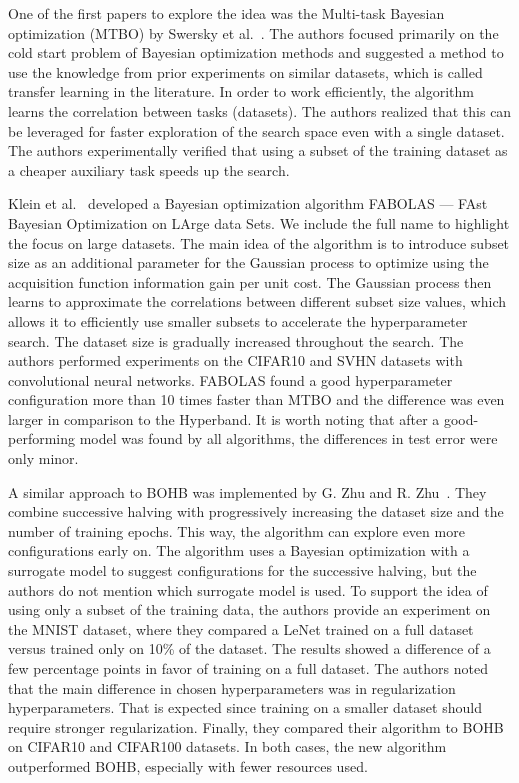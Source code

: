 One of the first papers to explore the idea was the Multi-task Bayesian optimization (MTBO) by Swersky et al.~\cite{swersky2013multi}. The authors focused primarily on the cold start problem of Bayesian optimization methods and suggested a method to use the knowledge from prior experiments on similar datasets, which is called transfer learning in the literature. In order to work efficiently, the algorithm learns the correlation between tasks (datasets). The authors realized that this can be leveraged for faster exploration of the search space even with a single dataset. The authors experimentally verified that using a subset of the training dataset as a cheaper auxiliary task speeds up the search.

Klein et al.~\cite{klein2017fast} developed a Bayesian optimization algorithm FABOLAS --- FAst Bayesian Optimization on LArge data Sets. We include the full name to highlight the focus on large datasets. The main idea of the algorithm is to introduce subset size as an additional parameter for the Gaussian process to optimize using the acquisition function information gain per unit cost. The Gaussian process then learns to approximate the correlations between different subset size values, which allows it to efficiently use smaller subsets to accelerate the hyperparameter search. The dataset size is gradually increased throughout the search. The authors performed experiments on the CIFAR10 and SVHN datasets with convolutional neural networks. FABOLAS found a good hyperparameter configuration more than 10 times faster than MTBO and the difference was even larger in comparison to the Hyperband. It is worth noting that after a good-performing model was found by all algorithms, the differences in test error were only minor.


A similar approach to BOHB was implemented by G. Zhu and R. Zhu~\cite{zhu2020accelerating}. They combine successive halving with progressively increasing the dataset size and the number of training epochs. This way, the algorithm can explore even more configurations early on. The algorithm uses a Bayesian optimization with a surrogate model to suggest configurations for the successive halving, but the authors do not mention which surrogate model is used. To support the idea of using only a subset of the training data, the authors provide an experiment on the MNIST dataset, where they compared a LeNet trained on a full dataset versus trained only on 10\% of the dataset. The results showed a difference of a few percentage points in favor of training on a full dataset. The authors noted that the main difference in chosen hyperparameters was in regularization hyperparameters. That is expected since training on a smaller dataset should require stronger regularization. Finally, they compared their algorithm to BOHB on CIFAR10 and CIFAR100 datasets. In both cases, the new algorithm outperformed BOHB, especially with fewer resources used.

